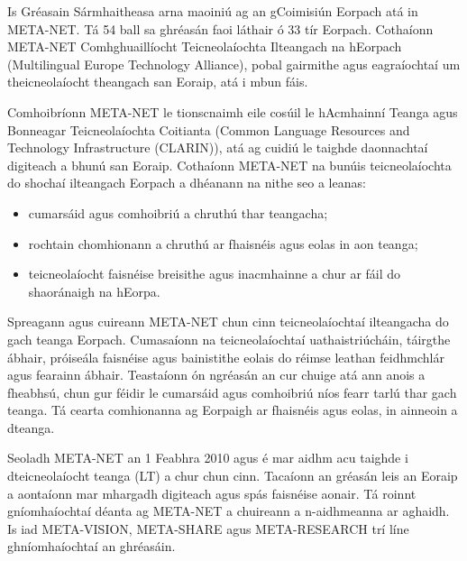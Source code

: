 \documentclass[]{../../metanetpaper}
\begin{document}
\cleardoublepage



\begin{multicols}{2}

Is Gréasain Sármhaitheasa arna maoiniú ag an gCoimisiún Eorpach atá in META-NET. Tá 54 ball sa ghréasán faoi láthair ó 33 tír Eorpach. Cothaíonn META-NET Comhghuaillíocht Teicneolaíochta Ilteangach na hEorpach (Multilingual Europe Technology Alliance), pobal gairmithe agus eagraíochtaí um theicneolaíocht theangach san Eoraip, atá i mbun fáis.
 
Comhoibríonn META-NET le tionscnaimh eile cosúil le hAcmhainní Teanga agus Bonneagar Teicneolaíochta Coitianta (Common Language Resources and Technology Infrastructure (CLARIN)), atá ag cuidiú le taighde daonnachtaí digiteach a bhunú san Eoraip. Cothaíonn META-NET na bunúis teicneolaíochta do shochaí ilteangach Eorpach a dhéanann na nithe seo a leanas:

\begin{itemize}
\item cumarsáid agus comhoibriú a chruthú thar teangacha;
\item rochtain chomhionann a chruthú ar fhaisnéis agus eolas in aon teanga;
\item teicneolaíocht faisnéise breisithe agus inacmhainne a chur ar fáil do shaoránaigh na hEorpa.
\end{itemize}

Spreagann agus cuireann META-NET chun cinn teicneolaíochtaí ilteangacha do gach teanga Eorpach. Cumasaíonn na teicneolaíochtaí uathaistriúcháin, táirgthe ábhair, próiseála faisnéise agus bainistithe eolais do réimse leathan feidhmchlár agus fearainn ábhair. Teastaíonn ón ngréasán an cur chuige atá ann anois a fheabhsú, chun gur féidir le cumarsáid agus comhoibriú níos fearr tarlú thar gach teanga. Tá cearta comhionanna ag Eorpaigh ar fhaisnéis agus eolas, in ainneoin a dteanga.

Seoladh META-NET an 1 Feabhra 2010 agus é mar aidhm acu taighde i dteicneolaíocht teanga (LT) a chur chun cinn. Tacaíonn an gréasán leis an Eoraip a aontaíonn mar mhargadh digiteach agus spás faisnéise aonair. Tá roinnt gníomhaíochtaí déanta ag META-NET a chuireann a n-aidhmeanna ar aghaidh. Is iad META-VISION, META-SHARE agus META-RESEARCH trí líne ghníomhaíochtaí an ghréasáin. 


\end{multicols}
\end{document}
